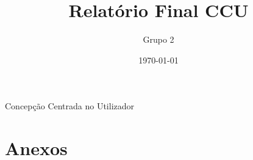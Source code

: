 \documentclass{report}
\title{Relatório Final CCU}
\author{Grupo 2}
\date{\today}
\begin{document}
\begin{acronym}
	 {Concepção Centrada no Utilizador}
\end{acronym}

\maketitle

\tableofcontents







%













\chapter{Anexos}




\end{document}
